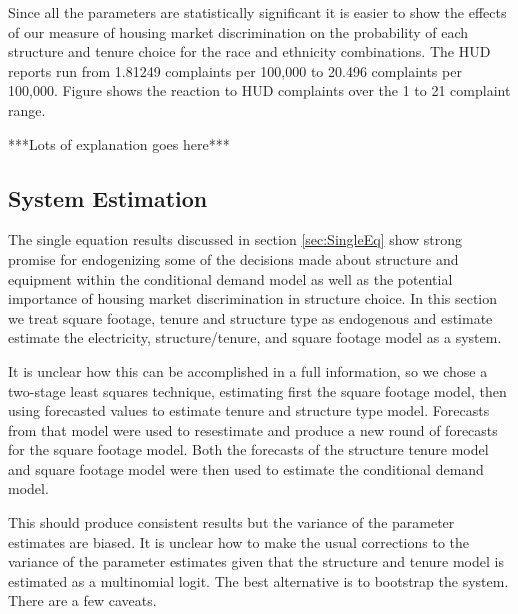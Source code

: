 \documentclass{article}
\begin{document}
Since all the parameters are statistically significant it is easier to show the effects of our measure of housing market discrimination on the probability of each structure and tenure choice for the race and ethnicity combinations.  The HUD reports run from 1.81249 complaints per 100,000 to 20.496 complaints per 100,000.  Figure 
shows the reaction to HUD complaints over the 1 to 21 complaint range.


% 
% 
% 

***Lots of explanation goes here***




  \subsection{System Estimation}

The single equation results discussed in section \ref{sec:SingleEq} show strong promise for endogenizing some of the decisions made about structure and equipment within the conditional demand model as well as the potential importance of housing market discrimination in structure choice.  In this section we treat square footage, tenure and structure type as endogenous and estimate estimate the electricity, structure/tenure, and square footage model as a system.

It is unclear how this can be accomplished in a full information, so we chose a two-stage least squares technique, estimating first the square footage model, then using forecasted values to estimate tenure and structure type model.  Forecasts from that model were used to resestimate and produce a new round of forecasts for the square footage model.  Both the forecasts of the structure tenure model and square footage model were then used to estimate the conditional demand model.

This should produce consistent results but the variance of the parameter estimates are biased.  It is unclear how to make the usual corrections to the variance of the parameter estimates given that the structure and tenure model is estimated as a multinomial logit.  The best alternative is to bootstrap the system.  There are a few caveats.
\end{document}
